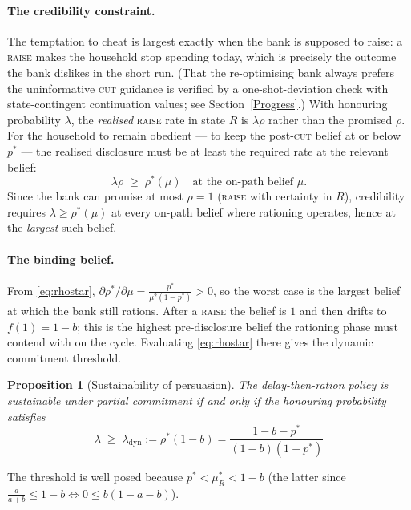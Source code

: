 \documentclass[12pt]{article}
\newtheorem{prop}{Proposition}
\begin{document}
\paragraph{The credibility constraint.} The temptation to cheat is largest exactly when the bank is supposed to raise: a \textsc{raise} makes the household stop spending today, which is precisely the outcome the bank dislikes in the short run. (That the re-optimising bank always prefers the uninformative \textsc{cut} guidance is verified by a one-shot-deviation check with state-contingent continuation values; see Section~\ref{Progress}.) With honouring probability $\lambda$, the \emph{realised} \textsc{raise} rate in state $R$ is $\lambda\rho$ rather than the promised $\rho$. For the household to remain obedient --- to keep the post-\textsc{cut} belief at or below $p^*$ --- the realised disclosure must be at least the required rate at the relevant belief:
\[
\lambda\rho \;\ge\; \rho^*(\mu) \quad\text{at the on-path belief } \mu .
\]
Since the bank can promise at most $\rho = 1$ (\textsc{raise} with certainty in $R$), credibility requires $\lambda \ge \rho^*(\mu)$ at every on-path belief where rationing operates, hence at the \emph{largest} such belief.

\paragraph{The binding belief.} From \eqref{eq:rhostar}, $\partial\rho^*/\partial\mu = \tfrac{p^*}{\mu^2(1-p^*)} > 0$, so the worst case is the largest belief at which the bank still rations. After a \textsc{raise} the belief is $1$ and then drifts to $f(1) = 1-b$; this is the highest pre-disclosure belief the rationing phase must contend with on the cycle. Evaluating \eqref{eq:rhostar} there gives the dynamic commitment threshold.

\begin{prop}[Sustainability of persuasion]\label{prop:lambda}
The delay-then-ration policy is sustainable under partial commitment if and only if the honouring probability satisfies
\begin{equation}\label{eq:lambda}
\boxed{\;\lambda \;\ge\; \lambda_{\mathrm{dyn}} := \rho^*(1-b) = \frac{1-b-p^*}{(1-b)(1-p^*)}\;}
\end{equation}
\end{prop}

The threshold is well posed because $p^* < \mu_R^* < 1-b$ (the latter since $\tfrac{a}{a+b} \le 1-b \iff 0 \le b(1-a-b)$).
\end{document}
